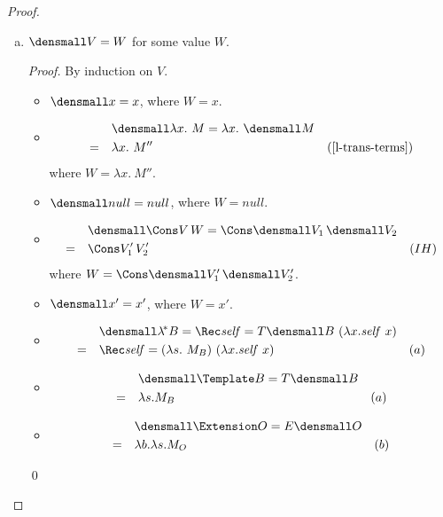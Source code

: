 \begin{proof}
\begin{enumerate}[(a)]
\begin{proof}
\begin{itemize}
\begin{align*}
            & \quad E\den{x ~O} =  \lambda b. \lambda x. E\den{\lambda P. O'} ~ b ~ x\\
            =& \quad \lambda b. \lambda x. (\lambda b. \lambda s. \lambda x. M') ~ b ~ x & (IH) \\
            =& \quad \lambda b. \lambda x. (\lambda x. M'\subst{s}{x}) & (\beta) \\
            =& \quad \lambda b. \lambda s. (\lambda x. M'\subst{s}{x})\subst{x}{s} & (\alpha)
        \end{align*}
    \end{itemize}
    \qed
\end{proof}
\item $\den{V} = W$ for some value $W$.
\begin{proof}
    By induction on $V$.
    \begin{itemize}
        \item $\den{x} = x$, where $W=x$.
        \item \begin{align*}
            & \quad \den{\lambda x. ~M} = \lambda x. ~\den{M} \\
            =& \quad \lambda x. ~M'' & (\cref{l-trans-terms})
        \end{align*}
        where $W = \lambda x. ~M''$.
        \item $\den{null} = null$, where $W=null$.
        \item \begin{align*}
            & \quad \den{\Cons V \, W} = \Cons \den{V_1} \, \den{V_2} \\
            =& \quad \Cons V_1' \, V_2' & (IH)
        \end{align*}
        where $W = \Cons \den{V_1'} \, \den{V_2'}$.
        \item $\den{x'} = x'$, where $W=x'$.
        \item \begin{align*}
            & \quad \den{\lamstar B} = \Rec \mathit{self} = T\den{B} ~ (\lambda x. \mathit{self} ~ x) \\
            =& \quad \Rec \mathit{self} = (\lambda s. ~M_B) ~ (\lambda x. \mathit{self} ~ x) & (a)
        \end{align*}
        \item \begin{align*}
            & \quad \den{\Template B} = T\den{B} \\
            =& \quad \lambda s. M_B& (a)
        \end{align*}
        \item \begin{align*}
            & \quad \den{\Extension O} = E\den{O} \\
            =& \quad \lambda b. \lambda s. M_O& (b)
        \end{align*}
    \end{itemize}
    \qed
\end{proof}
\end{enumerate}

\end{proof}


